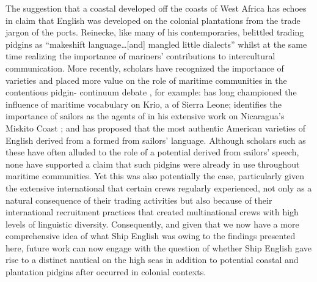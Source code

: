 The suggestion that a coastal  developed off the coasts of West Africa has echoes in  claim that  English was developed on the colonial plantations from the trade jargon of the ports. Reinecke, like many of his contemporaries, belittled trading pidgins as “makeshift language…[and] mangled little dialects” \citep[107]{Reinecke1938} whilst at the same time realizing the importance of mariners’ contributions to intercultural communication. More recently, scholars have recognized the importance of  varieties and placed more value on the role of maritime communities in the contentious pidgin- continuum debate \citep[7]{Holm1988}, for example: \citet{Hancock1976} has long championed the influence of maritime vocabulary on Krio, a  of Sierra Leone; \citet{Holm1981} identifies the importance of sailors as the agents of  in his extensive work on Nicaragua’s Miskito Coast ; and \citet{Dillard1992} has proposed that the most authentic American varieties of English derived from a  formed from sailors’ language. Although scholars such as these have often alluded to the role of a potential  derived from sailors’ speech, none have supported a claim that such pidgins were already in use throughout maritime communities. Yet this was also potentially the case, particularly given the extensive international  that certain crews regularly experienced, not only as a natural consequence of their trading activities but also because of their international recruitment practices that created multinational crews with high levels of linguistic diversity. Consequently, and given that we now have a more comprehensive idea of what Ship English was owing to the findings presented here, future work can now engage with the question of whether Ship English gave rise to a distinct nautical  on the high seas in addition to potential coastal and plantation pidgins after  occurred in colonial contexts. 

